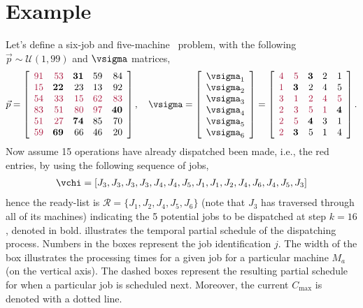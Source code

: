 \section{Example}
Let's define a six-job and five-machine \jsp\ problem, with the following $\vec{p}\sim\mathcal{U}(1,99)$ and $\vsigma$ matrices,
\begin{eqnarray}
\vec{p}=
\left[\begin{array}{rrrrr}
 \tcr{91} & \tcr{53} & \textbf{31} & 59 & 84 \\
 \tcr{15} & \textbf{22} & 23 & 13 & 92 \\
 \tcr{54} & \tcr{33} & \tcr{15} & \tcr{62} & \tcr{83} \\
 \tcr{83} & \tcr{51} & \tcr{80} & \tcr{97} & \textbf{40} \\
 \tcr{51} & \tcr{27} & \textbf{74} & 85 & 70 \\
 \tcr{59} & \textbf{69} & 66 & 46 & 20 
\end{array}\right], 
\quad \label{eq:psigma}
\vsigma=
\left[\begin{array}{r}
\vsigma_1 \\ \vsigma_2  \\ \vsigma_3 \\ \vsigma_4 \\ \vsigma_5 \\ \vsigma_6
\end{array}\right] =
\left[\begin{array}{rrrrr} 
 \tcr{4} & \tcr{5} & \textbf{3} & 2 & 1 \\
 \tcr{1} & \textbf{3} & 2 & 4 & 5 \\
 \tcr{3} & \tcr{1} & \tcr{2} & \tcr{4} & \tcr{5} \\
 \tcr{2} & \tcr{3} & \tcr{5} & \tcr{1} & \textbf{4} \\
 \tcr{2} & \tcr{5} & \textbf{4} & 3 & 1 \\
 \tcr{2} & \textbf{3} & 5 & 1 & 4 
\end{array}\right].
\end{eqnarray}
Now assume 15 operations have already dispatched been made, i.e., the red entries, by using the following sequence of jobs,
\begin{eqnarray}
\vchi=\left[J_3,J_3,J_3,J_3,J_4,J_4,J_5,J_1,J_1,J_2,J_4,J_6,J_4,J_5,J_3\right]
\end{eqnarray}
hence the ready-list is $\mathcal{R}=\{J_1,J_2,J_4,J_5,J_6\}$ (note that $J_3$ has traversed through all of its machines) indicating the 5 potential jobs to be dispatched at step $k=16$, denoted in bold.  illustrates the temporal partial schedule of the dispatching process.
Numbers in the boxes represent the job identification $j$. The width of the box illustrates the processing times for a given job for a particular machine $M_a$ (on the vertical axis). The dashed boxes represent the resulting partial schedule for when a particular job is scheduled next. Moreover, the current $C_{\max}$ is denoted with a dotted line.

